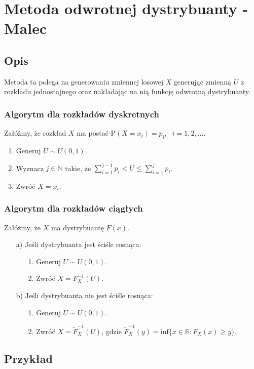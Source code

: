 \documentclass[12pt]{mwrep}
\begin{document}
	
	\section{Metoda odwrotnej dystrybuanty - Malec}
	\subsection{Opis}
	\noindent Metoda ta polega na generowaniu zmiennej losowej $X$ generując zmienną $U$ z rozkładu jednostajnego oraz nakładając na nią funkcję odwrotną dystrybuanty.
	\subsubsection{Algorytm dla rozkładów dyskretnych}
	\noindent Załóżmy, że rozkład $X$ ma postać $\mathrm{P}(X = x_i) = p_\mathrm{i}$, \ $i = 1, 2,\dots $.
	\begin{enumerate}
		\item Generuj $U \sim U(0, 1)$.
		\item Wyznacz $j \in \mathbb{N} $ takie, że $ \sum\limits_{i=1}^{j-1} p_i < U \leq \sum\limits_{i=1}^{j} p_i $.
		\item Zwróć $ X = x_i $.
	\end{enumerate}
	\subsubsection{Algorytm dla rozkładów ciągłych}
	\noindent Załóżmy, że $X$ ma dystrybuantę $F(x)$.
	\begin{enumerate}
		\item[a)] Jeśli dystrybuanta jest ściśle rosnąca:
		\begin{enumerate}
			\item[1.] Generuj $U \sim U(0, 1)$.
			\item[2.] Zwróć $ X = F_X^{-1}(U) $.
		\end{enumerate}
		\item[b)] Jeśli dystrybuanta nie jest ściśle rosnąca:
		\begin{enumerate}
			\item[1.] Generuj $U \sim U(0, 1)$.
			\item[2.] Zwróć $ X = \tilde{F}_X^{-1}(U) $, gdzie $ \tilde{F}_X^{-1}(y) = \mathrm{inf}\{x \in \mathbb{R}: F_X(x) \geq y\} $.
		\end{enumerate}
	\end{enumerate}
	\subsection{Przykład}
\end{document}

